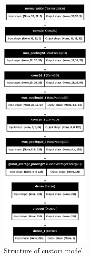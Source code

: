 \documentclass[runningheads]{llncs}
\begin{document}
\begin{figure}[ht]
    \centering
    \includegraphics[height=13cm]{graphics/custom_model.png}
    \caption{Structure of custom model}
    \label{fig:custom-cnn}
\end{figure}
\end{document}
